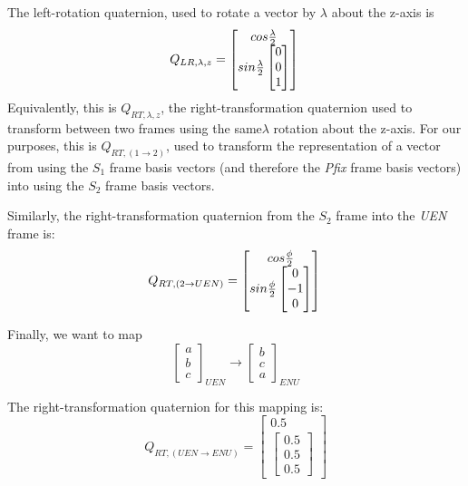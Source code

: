 \documentclass[11pt,fleqn]{report}
\begin{document}
The left-rotation quaternion, used to rotate a vector by $\lambda$ about the
z-axis is
\begin{equation*}
 Q_{LR, \lambda, z} =
 \begin{bmatrix}
 cos \frac{\lambda}{2} \\
 sin \frac{\lambda}{2}
 \begin{bmatrix}
 0 \\ 0 \\ 1
 \end{bmatrix}
 \end{bmatrix} \\
\end{equation*}
Equivalently, this is $Q_{RT, \lambda, z}$,
the right-transformation quaternion used to transform between two frames
using the same$\lambda$ rotation about the z-axis. For our purposes, this is
$Q_{RT,(1\rightarrow2)}$, used to transform the representation of a vector from
using the $S_1$ frame basis vectors (and therefore the \textit{Pfix} frame
basis vectors) into using the $S_2$ frame basis vectors.

Similarly, the right-transformation quaternion
from the $S_2$ frame into the \textit{UEN} frame is:
\begin{equation*}
 Q_{RT,(2\rightarrow UEN)} =
 \begin{bmatrix}
 cos \frac{\phi}{2} \\
 sin \frac{\phi}{2}
 \begin{bmatrix}
 0 \\ -1 \\ 0
 \end{bmatrix}
 \end{bmatrix} \\
\end{equation*}

Finally, we want to map
\begin{equation*}
 \begin{bmatrix} a \\ b \\ c \end{bmatrix}_{UEN}
 \rightarrow
 \begin{bmatrix} b \\ c \\ a \end{bmatrix}_{ENU}
\end{equation*}

The right-transformation quaternion for this mapping is:
\begin{equation*}
 Q_{RT,(UEN \rightarrow ENU)} =
 \begin{bmatrix}
 0.5 \\
 \begin{bmatrix}
 0.5 \\ 0.5 \\ 0.5
 \end{bmatrix}
 \end{bmatrix}
\end{equation*}
\end{document}

